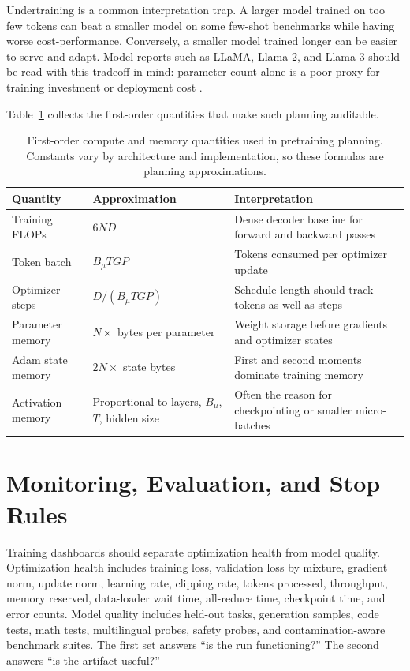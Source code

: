 Undertraining is a common interpretation trap. A larger model trained on too few tokens can beat a smaller model on some few-shot benchmarks while having worse cost-performance. Conversely, a smaller model trained longer can be easier to serve and adapt. Model reports such as LLaMA, Llama 2, and Llama 3 should be read with this tradeoff in mind: parameter count alone is a poor proxy for training investment or deployment cost \cite{touvron2023llama,touvron2023llama2,dubey2024llama3}.

Table~\ref{tab:pretraining-planning} collects the first-order quantities that make such planning auditable.

\begin{table}[t]
\caption{First-order compute and memory quantities used in pretraining planning. Constants vary by architecture and implementation, so these formulas are planning approximations.}
\label{tab:pretraining-planning}
\small
\begin{tabular}{@{}p{3.2cm}p{3.7cm}p{5.0cm}@{}}
\toprule
Quantity & Approximation & Interpretation \\
\midrule
Training FLOPs & $6ND$ & Dense decoder baseline for forward and backward passes \\
Token batch & $B_{\mu}TGP$ & Tokens consumed per optimizer update \\
Optimizer steps & $D/(B_{\mu}TGP)$ & Schedule length should track tokens as well as steps \\
Parameter memory & $N \times$ bytes per parameter & Weight storage before gradients and optimizer states \\
Adam state memory & $2N \times$ state bytes & First and second moments dominate training memory \\
Activation memory & Proportional to layers, $B_{\mu}$, $T$, hidden size & Often the reason for checkpointing or smaller micro-batches \\
\bottomrule
\end{tabular}
\end{table}

\section{Monitoring, Evaluation, and Stop Rules}
\label{sec:monitoring-stop-rules}

Training dashboards should separate optimization health from model quality. Optimization health includes training loss, validation loss by mixture, gradient norm, update norm, learning rate, clipping rate, tokens processed, throughput, memory reserved, data-loader wait time, all-reduce time, checkpoint time, and error counts. Model quality includes held-out tasks, generation samples, code tests, math tests, multilingual probes, safety probes, and contamination-aware benchmark suites. The first set answers ``is the run functioning?'' The second answers ``is the artifact useful?''

